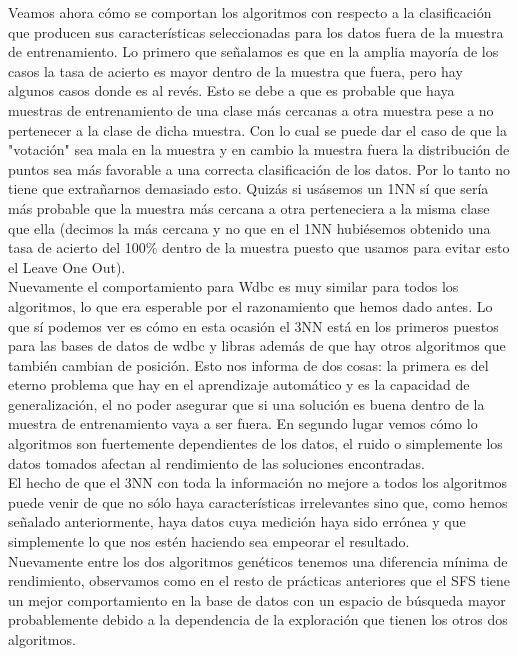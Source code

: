 \documentclass[10pt,a4paper]{article}
\begin{document}
Veamos ahora cómo se comportan los algoritmos con respecto a la clasificación que producen sus características seleccionadas para los datos fuera de la muestra de entrenamiento. Lo primero que señalamos es que en la amplia mayoría de los casos la tasa de acierto es mayor dentro de la muestra que fuera, pero hay algunos casos donde es al revés. Esto se debe a que es probable que haya muestras de entrenamiento de una clase más cercanas a otra muestra pese a no pertenecer a la clase de dicha muestra. Con lo cual se puede dar el caso de que la "votación" sea mala en la muestra y en cambio la muestra fuera la distribución de puntos sea más favorable a una correcta clasificación de los datos. Por lo tanto no tiene que extrañarnos demasiado esto. Quizás si usásemos un 1NN sí que sería más probable que la muestra más cercana a otra perteneciera a la misma clase que ella (decimos la más cercana y no que en el 1NN hubiésemos obtenido una tasa de acierto del 100\% dentro de la muestra puesto que usamos para evitar esto el Leave One Out).\\

Nuevamente el comportamiento para Wdbc es muy similar para todos los algoritmos, lo que era esperable por el razonamiento que hemos dado antes. Lo que sí podemos ver es cómo en esta ocasión el 3NN está en los primeros puestos para las bases de datos de wdbc y libras además de que hay otros algoritmos que también cambian de posición. Esto nos informa de dos cosas: la primera es del eterno problema que hay en el aprendizaje automático y es la capacidad de generalización, el no poder asegurar que si una solución es buena dentro de la muestra de entrenamiento vaya a ser fuera. En segundo lugar vemos cómo lo algoritmos son fuertemente dependientes de los datos, el ruido o simplemente los datos tomados afectan al rendimiento de las soluciones encontradas.\\

El hecho de que el 3NN con toda la información no mejore a todos los algoritmos puede venir de que no sólo haya características irrelevantes sino que, como hemos señalado anteriormente, haya datos cuya medición haya sido errónea y que simplemente lo que nos estén haciendo sea empeorar el resultado.\\

Nuevamente entre los dos algoritmos genéticos tenemos una diferencia mínima de rendimiento, observamos como en el resto de prácticas anteriores que el SFS tiene un mejor comportamiento en la base de datos con un espacio de búsqueda mayor probablemente debido a la dependencia de la exploración que tienen los otros dos algoritmos.\\
\end{document}
